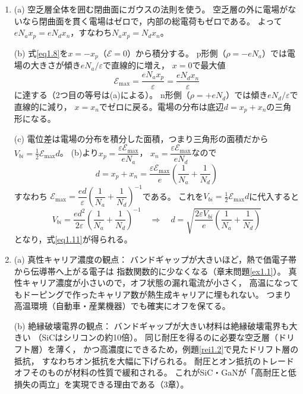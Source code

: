 \begin{enumerate}
\item[\ref{ex1.4}]
(a) 空乏層全体を囲む閉曲面にガウスの法則を使う。
空乏層の外に電場がないなら閉曲面を貫く電場はゼロで，内部の総電荷もゼロである。
よって$eN_a x_p = eN_d x_n$，すなわち$N_a x_p = N_d x_n$。

(b) 式\ref{eq1.8}を$x = -x_p$（$\mathcal{E} = 0$）から積分する。
p形側（$\rho = -eN_a$）では電場の大きさが傾き$eN_a/\varepsilon$で直線的に増え，
$x = 0$で最大値
\begin{equation*}
\mathcal{E}_{\max} = \frac{eN_a x_p}{\varepsilon} = \frac{eN_d x_n}{\varepsilon}
\end{equation*}
に達する（2つ目の等号は(a)による）。
n形側（$\rho = +eN_d$）では傾き$eN_d/\varepsilon$で直線的に減り，
$x = x_n$でゼロに戻る。電場の分布は底辺$d = x_p + x_n$の三角形になる。

(c) 電位差は電場の分布を積分した面積，つまり三角形の面積だから
$V_{bi} = \frac{1}{2}\mathcal{E}_{\max}d$。
(b)より$x_p = \dfrac{\varepsilon\mathcal{E}_{\max}}{eN_a}$，
$x_n = \dfrac{\varepsilon\mathcal{E}_{\max}}{eN_d}$なので
\begin{equation*}
d = x_p + x_n = \frac{\varepsilon\mathcal{E}_{\max}}{e}
\left(\frac{1}{N_a}+\frac{1}{N_d}\right)
\end{equation*}
すなわち
$\mathcal{E}_{\max} = \dfrac{ed}{\varepsilon}
\left(\dfrac{1}{N_a}+\dfrac{1}{N_d}\right)^{-1}$である。
これを$V_{bi} = \frac{1}{2}\mathcal{E}_{\max}d$に代入すると
\begin{equation*}
V_{bi} = \frac{ed^2}{2\varepsilon}\left(\frac{1}{N_a}+\frac{1}{N_d}\right)^{-1}
\quad\Rightarrow\quad
d = \sqrt{\frac{2\varepsilon V_{bi}}{e}\left(\frac{1}{N_a}+\frac{1}{N_d}\right)}
\end{equation*}
となり，式\ref{eq1.11}が得られる。

\item[\ref{ex1.5}]
(a) 真性キャリア濃度の観点：
バンドギャップが大きいほど，熱で価電子帯から伝導帯へ上がる電子は
指数関数的に少なくなる（章末問題\ref{ex1.1}）。
真性キャリア濃度が小さいので，オフ状態の漏れ電流が小さく，
高温になってもドーピングで作ったキャリア数が熱生成キャリアに埋もれない。
つまり高温環境（自動車・産業機器）でも確実にオフを保てる。

(b) 絶縁破壊電界の観点：
バンドギャップが大きい材料は絶縁破壊電界も大きい
（SiCはシリコンの約10倍）。
同じ耐圧を得るのに必要な空乏層（ドリフト層）を薄く，
かつ高濃度にできるため，例題\ref{rei1.2}で見たドリフト層の抵抗，
すなわちオン抵抗を大幅に下げられる。
耐圧とオン抵抗のトレードオフそのものが材料の性質で緩和される。
これがSiC・GaNが「高耐圧と低損失の両立」を実現できる理由である（3章）。

\end{enumerate}
